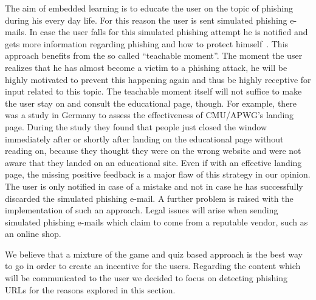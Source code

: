 \begin{description}[leftmargin=0cm]
	\item[Emdedded Learning] The aim of embedded learning is to educate the user on the topic of phishing during his every day life.
 For this reason the user is sent simulated phishing e-mails.
 In case the user falls for this simulated phishing attempt he is notified and gets more information regarding phishing and how to protect himself~\cite{embedded2011jansson, kumaraguru2009phishguru}. 
This approach benefits from the so called ``teachable moment''. 
The moment the user realizes that he has almost become a victim to a phishing attack, he will be highly motivated to prevent this happening again and thus be highly receptive for input related to this topic.
 The teachable moment itself will not suffice to make the user stay on and consult the educational page, though.
 For example, there was a study in Germany to assess the effectiveness of CMU/APWG's landing page. 
 During the study they found that people just closed the window immediately after or shortly after landing on the educational page without reading on,  because they thought they were on the wrong website and were not aware that they landed on an educational site.
 Even if with an effective landing page, the missing positive feedback is a major flaw of this strategy in our opinion.
 The user is only notified in case of a mistake and not in case he has successfully discarded the simulated phishing e-mail.
 A further problem is raised with the implementation of such an approach.
 Legal issues will arise when sending simulated phishing e-mails which claim to come from a reputable vendor, such as an online shop.

\end{description}

We believe that a mixture of the game and quiz based approach is the best way to go in order to create an incentive for the users. 
Regarding the content which will be communicated to the user we decided to focus on detecting phishing URLs for the reasons explored in this section.

